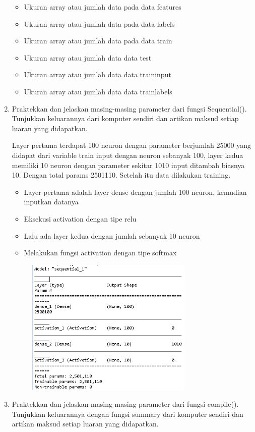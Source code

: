 \begin{enumerate}
\begin{figure}[H]
	\end{figure}
	\begin{itemize}
		\item Ukuran array atau jumlah data pada data features
		\item Ukuran array atau jumlah data pada data labels
		\item Ukuran array atau jumlah data pada data train
		\item Ukuran array atau jumlah data data test
		\item Ukuran array atau jumlah data data traininput
		\item Ukuran array atau jumlah data data trainlabels
	\end{itemize}
	\item Praktekkan dan jelaskan masing-masing parameter dari fungsi Sequential(). Tunjukkan keluarannya dari komputer sendiri dan artikan maksud setiap luaran yang didapatkan.
	\hfill\break
	
	Layer pertama terdapat 100 neuron dengan parameter berjumlah 25000 yang didapat dari variable train input dengan neuron sebanyak 100, layer kedua memiliki 10 neuron dengan parameter sekitar 1010 input ditambah biasnya 10. Dengan total params 2501110. Setelah itu data dilakukan training.
	\begin{itemize}
		\item Layer pertama adalah layer dense dengan jumlah 100 neuron, kemudian inputkan datanya
		\item Eksekusi activation dengan tipe relu
		\item Lalu ada layer kedua dengan jumlah sebanyak 10 neuron
		\item Melakukan fungsi activation dengan tipe softmax
	\end{itemize}
	\hfill\break
	\begin{figure}[H]
		\includegraphics[width=8cm]{figures/1174079/6/7.PNG}
		\centering
	\end{figure}	
	\item Praktekkan dan jelaskan masing-masing parameter dari fungsi compile(). Tunjukkan keluarannya dengan fungsi summary dari komputer sendiri dan artikan maksud setiap luaran yang didapatkan.
	\hfill\break
	


\end{enumerate}
